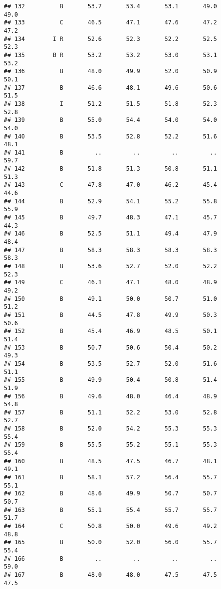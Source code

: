 \documentclass[]{article}
\begin{document}
\begin{verbatim}
## 132          B       53.7       53.4       53.1       49.0       49.0
## 133          C       46.5       47.1       47.6       47.2       47.2
## 134        I R       52.6       52.3       52.2       52.5       52.3
## 135        B R       53.2       53.2       53.0       53.1       53.2
## 136          B       48.0       49.9       52.0       50.9       50.1
## 137          B       46.6       48.1       49.6       50.6       51.5
## 138          I       51.2       51.5       51.8       52.3       52.8
## 139          B       55.0       54.4       54.0       54.0       54.0
## 140          B       53.5       52.8       52.2       51.6       48.1
## 141          B         ..         ..         ..         ..       59.7
## 142          B       51.8       51.3       50.8       51.1       51.3
## 143          C       47.8       47.0       46.2       45.4       44.6
## 144          B       52.9       54.1       55.2       55.8       55.9
## 145          B       49.7       48.3       47.1       45.7       44.3
## 146          B       52.5       51.1       49.4       47.9       48.4
## 147          B       58.3       58.3       58.3       58.3       58.3
## 148          B       53.6       52.7       52.0       52.2       52.3
## 149          C       46.1       47.1       48.0       48.9       49.2
## 150          B       49.1       50.0       50.7       51.0       51.2
## 151          B       44.5       47.8       49.9       50.3       50.6
## 152          B       45.4       46.9       48.5       50.1       51.4
## 153          B       50.7       50.6       50.4       50.2       49.3
## 154          B       53.5       52.7       52.0       51.6       51.1
## 155          B       49.9       50.4       50.8       51.4       51.9
## 156          B       49.6       48.0       46.4       48.9       54.8
## 157          B       51.1       52.2       53.0       52.8       52.7
## 158          B       52.0       54.2       55.3       55.3       55.4
## 159          B       55.5       55.2       55.1       55.3       55.4
## 160          B       48.5       47.5       46.7       48.1       49.1
## 161          B       58.1       57.2       56.4       55.7       55.1
## 162          B       48.6       49.9       50.7       50.7       50.7
## 163          B       55.1       55.4       55.7       55.7       51.7
## 164          C       50.8       50.0       49.6       49.2       48.8
## 165          B       50.0       52.0       56.0       55.7       55.4
## 166          B         ..         ..         ..         ..       59.0
## 167          B       48.0       48.0       47.5       47.5       47.5

\end{verbatim}
\end{document}
